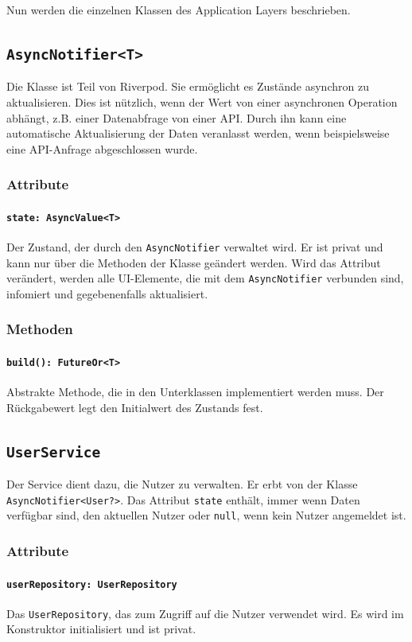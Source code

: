 \documentclass{entwurfsheft}
\begin{document}
Nun werden die einzelnen Klassen des Application Layers beschrieben.
\newpage
\subsection{\texttt{AsyncNotifier<T>}}
\label{sec:AsyncNotifier}
Die Klasse ist Teil von Riverpod. Sie ermöglicht es Zustände asynchron zu aktualisieren. Dies ist nützlich, wenn der Wert von einer asynchronen Operation abhängt, z.B. einer Datenabfrage von einer API. Durch ihn kann eine automatische Aktualisierung der Daten veranlasst werden, wenn beispielsweise eine API-Anfrage abgeschlossen wurde.
\subsubsection*{Attribute}
\paragraph{\texttt{state: AsyncValue<T>}}
Der Zustand, der durch den \texttt{AsyncNotifier} verwaltet wird. Er ist privat und kann nur über die Methoden der Klasse geändert werden. Wird das Attribut verändert, werden alle UI-Elemente, die mit dem \texttt{AsyncNotifier} verbunden sind, infomiert und gegebenenfalls aktualisiert.
\subsubsection*{Methoden}
\paragraph{\texttt{build(): FutureOr<T>}}
Abstrakte Methode, die in den Unterklassen implementiert werden muss. Der Rückgabewert legt den Initialwert des Zustands fest.
\newpage
\subsection{\texttt{UserService}}\label{sec:UserService}
Der Service dient dazu, die Nutzer zu verwalten. Er erbt von der Klasse \texttt{AsyncNotifier<User?>}.  Das Attribut \texttt{state} enthält, immer wenn Daten verfügbar sind, den aktuellen Nutzer oder \texttt{null}, wenn kein Nutzer angemeldet ist.

\subsubsection*{Attribute}
\paragraph{\texttt{userRepository: UserRepository}}
Das \texttt{UserRepository}, das zum Zugriff auf die Nutzer verwendet wird. Es wird im Konstruktor initialisiert und ist privat.
\end{document}
